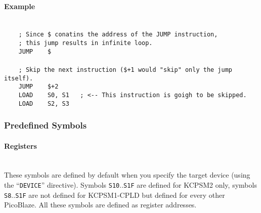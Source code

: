             \paragraph{Example}~\\
                \verb'    ; Since $ conatins the address of the JUMP instruction,'\\
                \verb'    ; this jump results in infinite loop.'\\
                \verb'    JUMP    $'\\
                \verb''\\
                \verb'    ; Skip the next instruction ($+1 would "skip" only the jump itself).'\\
                \verb'    JUMP    $+2'\\
                \verb'    LOAD    S0, S1   ; <-- This instruction is goigh to be skipped.'\\
                \verb'    LOAD    S2, S3'

        \clearpage
        \subsubsection{Predefined Symbols}
            \paragraph{Registers}~\\
                These symbols are defined by default when you specify the target device (using the ``\texttt{DEVICE}'' directive). Symbols \texttt{S10}..\texttt{S1F} are defined for KCPSM2 only, symbols \texttt{S8}..\texttt{S1F} are not defined for KCPSM1-CPLD but defined for every other PicoBlaze. All these symbols are defined as register addresses.


